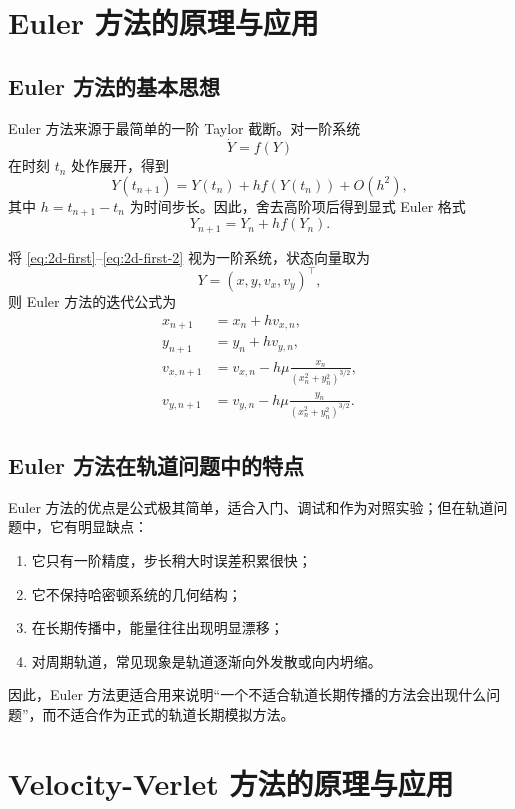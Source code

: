 \documentclass[12pt,a4paper]{ctexrep}
\begin{document}
\section{Euler 方法的原理与应用}

\subsection{Euler 方法的基本思想}

Euler 方法来源于最简单的一阶 Taylor 截断。对一阶系统
\[
\dot Y=f(Y)
\]
在时刻 \(t_n\) 处作展开，得到
\[
Y(t_{n+1})=Y(t_n)+h f(Y(t_n))+O(h^2),
\]
其中 \(h=t_{n+1}-t_n\) 为时间步长。因此，舍去高阶项后得到显式 Euler 格式
\begin{equation}\label{eq:euler-general}
Y_{n+1}=Y_n+h f(Y_n).
\end{equation}

将 \eqref{eq:2d-first}--\eqref{eq:2d-first-2} 视为一阶系统，状态向量取为
\[
Y=(x,y,v_x,v_y)^\top,
\]
则 Euler 方法的迭代公式为
\begin{align}
 x_{n+1} &= x_n+h v_{x,n},\label{eq:euler-x}\\
 y_{n+1} &= y_n+h v_{y,n},\label{eq:euler-y}\\
 v_{x,n+1} &= v_{x,n}-h\mu \frac{x_n}{(x_n^2+y_n^2)^{3/2}},\label{eq:euler-vx}\\
 v_{y,n+1} &= v_{y,n}-h\mu \frac{y_n}{(x_n^2+y_n^2)^{3/2}}.\label{eq:euler-vy}
\end{align}

\subsection{Euler 方法在轨道问题中的特点}

Euler 方法的优点是公式极其简单，适合入门、调试和作为对照实验；但在轨道问题中，它有明显缺点：
\begin{enumerate}[label=\arabic*.]
  \item 它只有一阶精度，步长稍大时误差积累很快；
  \item 它不保持哈密顿系统的几何结构；
  \item 在长期传播中，能量往往出现明显漂移；
  \item 对周期轨道，常见现象是轨道逐渐向外发散或向内坍缩。
\end{enumerate}
因此，Euler 方法更适合用来说明“一个不适合轨道长期传播的方法会出现什么问题”，而不适合作为正式的轨道长期模拟方法。

\section{Velocity-Verlet 方法的原理与应用}
\end{document}
